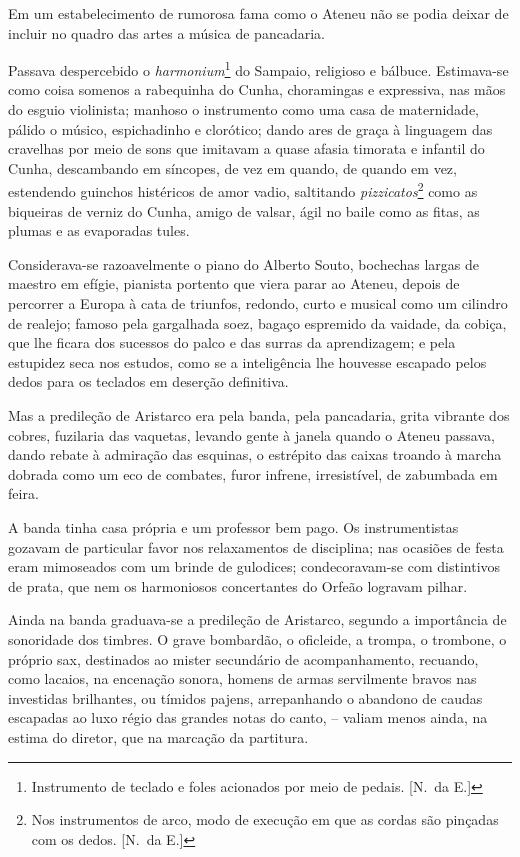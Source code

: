 Em um estabelecimento de
rumorosa fama como o Ateneu não se podia deixar de incluir no quadro
das artes a música de pancadaria. 


Passava despercebido o \textit{harmonium}\footnote{ Instrumento de teclado 
e foles acionados por meio de pedais. [N.~da E.]} do
Sampaio, religioso e bálbuce. Estimava{}-se como coisa somenos a
rabequinha do Cunha, choramingas e expressiva, nas mãos do esguio
violinista; manhoso o instrumento como uma casa de maternidade, pálido
o músico, espichadinho e clorótico; dando ares de graça à linguagem das
cravelhas por meio de sons que imitavam a quase afasia timorata e
infantil do Cunha, descambando em síncopes, de vez em quando, de quando
em vez, estendendo guinchos histéricos de amor vadio, saltitando
\textit{pizzicatos}\footnote{ Nos instrumentos de arco, modo de execução em  
que as cordas são pinçadas com os dedos. [N.~da E.]}
como as biqueiras de verniz do Cunha, amigo de valsar, ágil
no baile como as fitas, as plumas e as evaporadas tules.


Considerava{}-se razoavelmente o piano do Alberto Souto, bochechas
largas de maestro em efígie, pianista portento que viera parar ao
Ateneu, depois de percorrer a Europa à cata de triunfos, redondo, curto
e musical como um cilindro de realejo; famoso pela gargalhada soez,
bagaço espremido da vaidade, da cobiça, que lhe ficara dos sucessos do
palco e das surras da aprendizagem; e pela estupidez seca nos estudos,
como se a inteligência lhe houvesse escapado pelos dedos para os
teclados em deserção definitiva. 

Mas a predileção de Aristarco era pela
banda, pela pancadaria, grita vibrante dos cobres, fuzilaria das
vaquetas, levando gente à janela quando o Ateneu passava, dando rebate
à admiração das esquinas, o estrépito das caixas troando à marcha
dobrada como um eco de combates, furor infrene, irresistível, de
zabumbada em feira. 

A banda tinha casa própria e um professor bem pago.
Os instrumentistas gozavam de particular favor nos relaxamentos de
disciplina; nas ocasiões de festa eram mimoseados com um brinde de
gulodices; condecoravam{}-se com distintivos de prata, que nem os
harmoniosos concertantes do Orfeão logravam pilhar. 

Ainda na banda
graduava{}-se a predileção de Aristarco, segundo a importância de
sonoridade dos timbres. O grave bombardão, o oficleide, a trompa, o
trombone, o próprio sax, destinados ao mister secundário de
acompanhamento, recuando, como lacaios, na encenação sonora, homens de
armas servilmente bravos nas investidas brilhantes, ou tímidos pajens,
arrepanhando o abandono de caudas escapadas ao luxo régio das grandes
notas do canto, -- valiam menos ainda, na estima do diretor, que na
marcação da partitura. 


